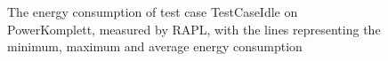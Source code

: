 \begin{figure}
                    \caption{The energy consumption of test case TestCaseIdle on PowerKomplett, measured by RAPL, with the lines representing the minimum, maximum and average energy consumption} \label{fig:time_series_TestCaseIdle_PowerKomplett_RAPL}
                    \end{figure}
                    